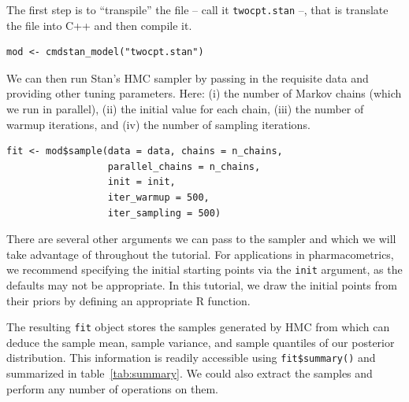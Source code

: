 The first step is to ``transpile'' the file -- call it \texttt{twocpt.stan} --, that is translate the file into C++ and then compile it.
\begin{lstlisting}
mod <- cmdstan_model("twocpt.stan")
\end{lstlisting}
%
We can then run Stan's HMC sampler by passing in the requisite data and providing other tuning parameters.
Here: (i) the number of Markov chains (which we run in parallel), (ii) the initial value for each chain, (iii) the number of warmup iterations, and (iv) the number of sampling iterations.
\begin{lstlisting}
fit <- mod$sample(data = data, chains = n_chains,
                  parallel_chains = n_chains,
                  init = init,
                  iter_warmup = 500, 
                  iter_sampling = 500)
\end{lstlisting}
%
There are several other arguments we can pass to the sampler and which we will take advantage of throughout the tutorial.
For applications in pharmacometrics, we recommend specifying the initial starting points via the \texttt{init} argument, as the defaults may not be appropriate.
In this tutorial, we draw the initial points from their priors by defining an appropriate R function.

The resulting \texttt{fit} object stores the samples generated by HMC from which can deduce the sample mean, sample variance, and sample quantiles of our posterior distribution.
This information is readily accessible using \texttt{fit\$summary()} and summarized in table~\ref{tab:summary}.
We could also extract the samples and perform any number of operations on them.

